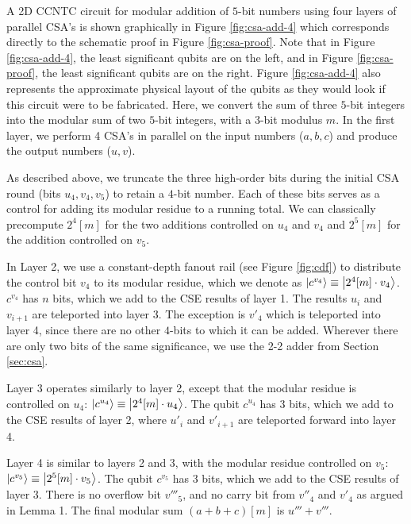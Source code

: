 A \textsc{2D CCNTC} circuit for modular addition of $5$-bit numbers using
four layers of parallel CSA's is shown graphically in Figure \ref{fig:csa-add-4}
which corresponds directly to the schematic proof in Figure \ref{fig:csa-proof}.
Note that in Figure \ref{fig:csa-add-4}, the least significant qubits are
on the left, and in Figure \ref{fig:csa-proof}, the least significant qubits are
on the right.
Figure \ref{fig:csa-add-4} also represents the approximate
physical layout of the qubits as they would look if this
circuit were to be fabricated.
Here, we convert the sum of three
$5$-bit integers into the modular sum of two $5$-bit integers, with a
$3$-bit modulus $m$.
In the first layer,
we perform 4 CSA's in parallel on the input numbers ($a,b,c$) and produce the
output numbers ($u, v$).

As described above, we truncate
the three high-order bits during the initial CSA round
(bits $u_4, v_4, v_5$) to retain a $4$-bit number.
Each of these bits serves as a control for adding its modular residue to
a running total. We can classically precompute $2^4[m]$ for the two
additions controlled on $u_4$ and $v_4$ and
$2^5[m]$ for the addition controlled on $v_5$.

In Layer 2,
we use a constant-depth fanout rail (see Figure \ref{fig:cdf}) to
distribute the control bit $v_4$ to its modular residue, which we denote as
$\left\vert{c^{v_4}}\right\rangle \equiv \left\vert{2^4[m]\cdot v_4}\right\rangle$.
$c^{v_4}$ has $n$ bits, which we add to the CSE results of layer 1.
The results $u_i$ and $v_{i+1}$ are teleported into layer 3. The exception is
$v'_4$ which is teleported into layer 4, since there are no other $4$-bits
to which it can be added. Wherever there are only
two bits of the same significance, we use the 2-2 adder from
Section \ref{sec:csa}.

Layer 3
operates similarly to layer 2, except that the modular residue is controlled on
$u_4$:
$\left\vert{c^{u_4}}\right\rangle \equiv \left\vert{2^4[m] \cdot u_4}\right\rangle$.
The qubit $c^{u_4}$ has $3$ bits, which we
add to the CSE results of layer 2, where $u'_i$ and $v'_{i+1}$ are teleported
forward into layer 4.

Layer 4
is similar to layers 2 and 3, with the modular residue controlled on $v_5$:
$\left\vert{c^{v_5}}\right\rangle \equiv \left\vert{2^5[m] \cdot v_5}\right\rangle$.
The qubit $c^{v_5}$ has $3$ bits, which we
add to the CSE results of layer 3.
There is no overflow bit $v'''_5$, and no carry bit from $v''_4$ and $v'_4$
as argued in Lemma 1.
The final modular sum $(a+b+c)[m]$ is $u'''+v'''$.

